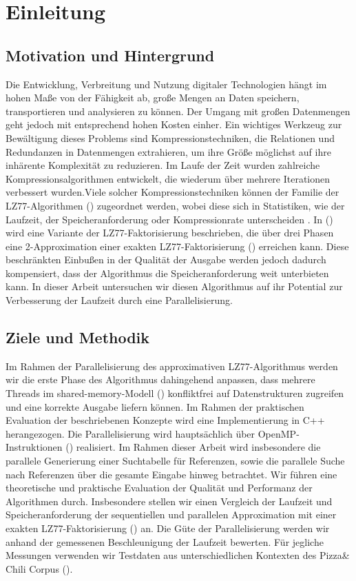\chapter{Einleitung}
\section{Motivation und Hintergrund}
Die Entwicklung, Verbreitung und Nutzung digitaler Technologien hängt im hohen Maße von der Fähigkeit ab, große Mengen an Daten speichern, transportieren und
analysieren zu können. Der Umgang mit großen Datenmengen geht jedoch mit entsprechend hohen Kosten einher. Ein wichtiges Werkzeug zur Bewältigung dieses Problems
sind Kompressionstechniken, die Relationen und Redundanzen in Datenmengen extrahieren, um ihre Größe möglichst auf ihre inhärente Komplexität zu reduzieren. 
Im Laufe der Zeit wurden zahlreiche Kompressionsalgorithmen entwickelt, die wiederum über mehrere Iterationen verbessert wurden.Viele solcher Kompressionstechniken
können der Familie der LZ77-Algorithmen (\cite{LemZiv}) zugeordnet werden, wobei diese sich in Statistiken, wie der Laufzeit, der Speicheranforderung oder Kompressionrate unterscheiden
. In (\cite{ApproxLZ77}) wird eine Variante der LZ77-Faktorisierung beschrieben, die über drei Phasen eine 2-Approximation einer exakten LZ77-Faktorisierung
 (\cite{exactLemZiv}) erreichen kann. Diese beschränkten Einbußen in der Qualität der Ausgabe werden jedoch dadurch kompensiert, dass der Algorithmus die Speicheranforderung
weit unterbieten kann. In dieser Arbeit untersuchen wir diesen Algorithmus auf ihr Potential zur Verbesserung der Laufzeit durch eine Parallelisierung.

\section{Ziele und Methodik}
Im Rahmen der Parallelisierung des approximativen LZ77-Algorithmus werden wir die erste Phase des Algorithmus dahingehend anpassen, dass mehrere Threads im 
shared-memory-Modell (\cite{jaja}) konfliktfrei auf Datenstrukturen zugreifen und eine korrekte Ausgabe liefern können. Im Rahmen der praktischen Evaluation der
beschriebenen Konzepte wird eine Implementierung in C++ herangezogen. Die Parallelisierung wird hauptsächlich über OpenMP-Instruktionen (\cite{openmp}) realisiert.
Im Rahmen dieser Arbeit wird insbesondere die parallele Generierung einer Suchtabelle für Referenzen, sowie die parallele Suche nach Referenzen über die gesamte Eingabe
hinweg betrachtet. Wir führen eine theoretische und praktische Evaluation der Qualität und Performanz der Algorithmen durch. Insbesondere stellen wir einen Vergleich der
Laufzeit und Speicheranforderung der sequentiellen und parallelen Approximation mit einer exakten LZ77-Faktorisierung (\cite{exactLemZiv}) an. Die Güte der Parallelisierung
werden wir anhand der gemessenen Beschleunigung der Laufzeit bewerten. Für jegliche Messungen verwenden wir Testdaten aus unterschiedlichen Kontexten des 
Pizza\& Chili Corpus (\cite{corpus}).